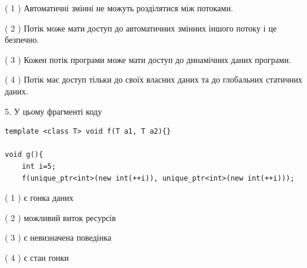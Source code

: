 \documentclass[12pt, ukrainian]{article}
\begin{document}
\begin {large}
{( 1 ) Автоматичні змінні не можуть розділятися між потоками.%

( 2 ) Потік може мати доступ до автоматичних змінних іншого потоку і це безпечно.%

( 3 ) Кожен потік програми може мати доступ до динамічних даних програми.%

( 4 ) Потік має доступ тільки до своїх власних даних та до глобальних статичних даних.%


5. У цьому фрагменті коду
\begin{verbatim}
template <class T> void f(T a1, T a2){}

void g(){
    int i=5;
    f(unique_ptr<int>(new int(++i)), unique_ptr<int>(new int(++i)));
\end{verbatim}

( 1 ) є гонка даних%

( 2 ) можливий виток ресурсів%

( 3 ) є невизначена поведінка%

( 4 ) є стан гонки%
}
\end {large}
\end{document}
